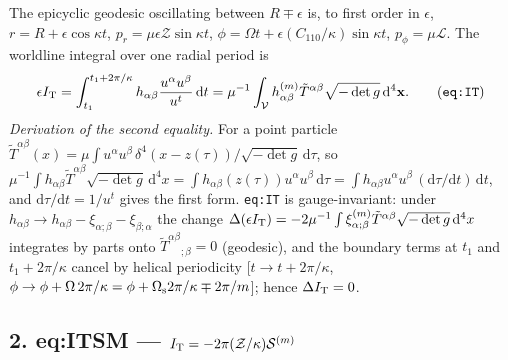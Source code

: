 \documentclass{article}
\newcommand{\rmd}{\mathrm{d}}
\newcommand{\mass}{\mu}
\begin{document}
The epicyclic geodesic oscillating between $R\mp\epsilon$ is, to first order in $\epsilon$,
$r=R+\epsilon\cos\kappa t$, $p_r=\mass\epsilon\mathcal{Z}\sin\kappa t$,
$\phi=\Omega t+\epsilon(C_{110}/\kappa)\sin\kappa t$, $p_\phi=\mass\mathcal{L}$. The worldline integral over one
radial period is
\begin{equation}
  \epsilon I_{\rm T}=\int_{t_1}^{t_1+2\pi/\kappa} h_{\alpha\beta}\frac{u^\alpha u^\beta}{u^t}\,\rmd t
  =\mass^{-1}\int_{\mathcal V} h^{(m)}_{\alpha\beta}\tilde T^{\alpha\beta}\sqrt{-\det g}\,\rmd^4\mathbf{x}.
  \tag{\texttt{eq:IT}}
\end{equation}
\emph{Derivation of the second equality.} For a point particle
$\tilde T^{\alpha\beta}(x)=\mass\int u^\alpha u^\beta\,\delta^4(x-z(\tau))/\sqrt{-\det g}\,\rmd\tau$, so
$\mass^{-1}\int h_{\alpha\beta}\tilde T^{\alpha\beta}\sqrt{-\det g}\,\rmd^4x
=\int h_{\alpha\beta}(z(\tau))u^\alpha u^\beta\,\rmd\tau
=\int h_{\alpha\beta}u^\alpha u^\beta\,(\rmd\tau/\rmd t)\,\rmd t$, and $\rmd\tau/\rmd t=1/u^t$ gives the first
form. \texttt{eq:IT} is gauge-invariant: under $h_{\alpha\beta}\to h_{\alpha\beta}-\xi_{\alpha;\beta}-\xi_{\beta;\alpha}$
the change $\Delta(\epsilon I_{\rm T})=-2\mass^{-1}\int\xi^{(m)}_{\alpha;\beta}\tilde T^{\alpha\beta}\sqrt{-\det g}\,\rmd^4x$
integrates by parts onto $\tilde T^{\alpha\beta}{}_{;\beta}=0$ (geodesic), and the boundary terms at $t_1$ and
$t_1+2\pi/\kappa$ cancel by helical periodicity [$t\to t+2\pi/\kappa$, $\phi\to\phi+\Omega\,2\pi/\kappa
=\phi+\Omega_{\rm s}2\pi/\kappa\mp2\pi/m$]; hence $\Delta I_{\rm T}=0$.

\subsection*{2. eq:ITSM --- $I_{\rm T}=-2\pi(\mathcal{Z}/\kappa)\mathcal{S}^{(m)}$}
\end{document}
